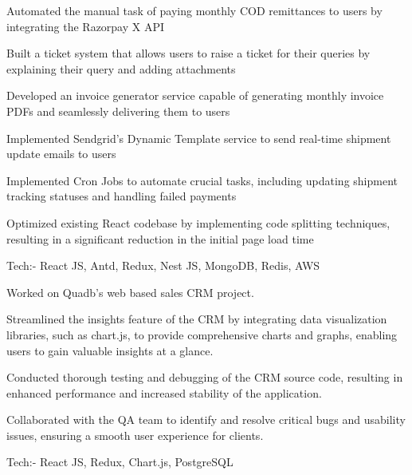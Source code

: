 \documentclass[]{deedy-resume-openfont}
\begin{document}
\begin{minipage}[t]{0.66\textwidth}
\begin{tightemize}
\item Automated the manual task of paying monthly COD remittances to users by integrating the Razorpay X API
\item Built a ticket system that allows users to raise a ticket for their queries by explaining their query and adding attachments
\item Developed an invoice generator service capable of generating monthly invoice PDFs and seamlessly delivering them to users
\item Implemented Sendgrid's Dynamic Template service to send real-time shipment update emails to users
\item Implemented Cron Jobs to automate crucial tasks, including updating shipment tracking statuses and handling failed payments
\item Optimized existing React codebase by implementing code splitting techniques, resulting in a significant reduction in the initial page load time
\item Tech:- React JS, Antd, Redux, Nest JS, MongoDB, Redis, AWS
\end{tightemize}
\sectionsep

\begin{tightemize}
\item Worked on Quadb's web based sales CRM project.
\item Streamlined the insights feature of the CRM by integrating data visualization libraries, such as chart.js, to provide comprehensive charts and graphs, enabling users to gain valuable insights at a glance.
\item Conducted thorough testing and debugging of the CRM source code, resulting in enhanced performance and increased stability of the application.
\item Collaborated with the QA team to identify and resolve critical bugs and usability issues, ensuring a smooth user experience for clients.
\item Tech:- React JS, Redux, Chart.js, PostgreSQL
\end{tightemize}
\sectionsep



\end{minipage}
\end{document}
